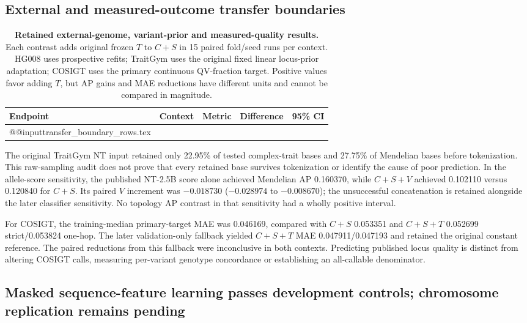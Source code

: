 \subsection{External and measured-outcome transfer boundaries}
\label{sec:s-transfer-boundaries}

\begin{table}[H]
\centering
\caption{\textbf{Retained external-genome, variant-prior and measured-quality results.} Each contrast adds original frozen $T$ to $C+S$ in 15 paired fold/seed runs per context. HG008 uses prospective refits; TraitGym uses the original fixed linear locus-prior adaptation; COSIGT uses the primary continuous QV-fraction target. Positive values favor adding $T$, but AP gains and MAE reductions have different units and cannot be compared in magnitude.}
\label{tab:s-transfer-boundaries}
\footnotesize
\begin{tabular}{@{}lllr l@{}}
\toprule
Endpoint & Context & Metric & Difference & 95\% CI \\
\midrule
\csname @@input\endcsname transfer_boundary_rows.tex
\bottomrule
\end{tabular}
\end{table}

The original TraitGym NT input retained only 22.95\% of tested complex-trait bases and 27.75\% of Mendelian bases before tokenization. This raw-sampling audit does not prove that every retained base survives tokenization or identify the cause of poor prediction. In the allele-score sensitivity, the published NT-2.5B score alone achieved Mendelian AP 0.160370, while $C+S+V$ achieved 0.102110 versus 0.120840 for $C+S$. Its paired $V$ increment was $-0.018730$ (\CI $-0.028974$ to $-0.008670$); the unsuccessful concatenation is retained alongside the later classifier sensitivity. No topology AP contrast in that sensitivity had a wholly positive interval.

For COSIGT, the training-median primary-target MAE was 0.046169, compared with $C+S$ 0.053351 and $C+S+T$ 0.052699 strict/0.053824 one-hop. The later validation-only fallback yielded $C+S+T$ MAE 0.047911/0.047193 and retained the original constant reference. The paired reductions from this fallback were inconclusive in both contexts. Predicting published locus quality is distinct from altering COSIGT calls, measuring per-variant genotype concordance or establishing an all-callable denominator.

\subsection{Masked sequence-feature learning passes development controls; chromosome replication remains pending}
\label{sec:masked-development}

